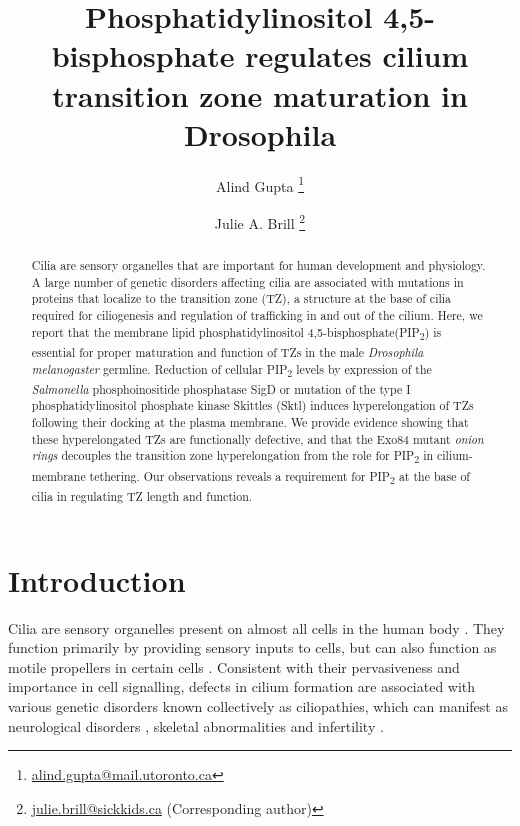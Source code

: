 \documentclass[12pt, twoside, letterpaper]{article}
\title{\bfseries\large Phosphatidylinositol 4,5-bisphosphate regulates cilium transition zone maturation in Drosophila}
\author[1,2]{Alind Gupta \thanks{\url{alind.gupta@mail.utoronto.ca}}}
\author[1,2]{Julie A. Brill \thanks{\url{julie.brill@sickkids.ca} (Corresponding author)}}
\affil[1]{Department of Molecular Genetics, University of Toronto, Toronto, ON M5S 1A8, Canada}
\affil[2]{Program in Cell Biology, Hospital for Sick Children, Toronto, ON M5G 1X8, Canada}
\date{}
\newcommand{\PIP}{PIP\textsubscript{2}}
\begin{document}
\maketitle
\raggedright
\begin{abstract}
  \vspace*{-0.7em}
  Cilia are sensory organelles that are important for human development
  and physiology.
  A large number of genetic disorders affecting cilia are associated with
  mutations in proteins that localize to the transition zone (TZ),
  a structure at the base of cilia required for ciliogenesis and
  regulation of trafficking in and out of the cilium.
  Here, we report that the membrane lipid phosphatidylinositol
  4,5-bisphosphate(\PIP{}) is essential for proper maturation and function
  of TZs in the male \textit{Drosophila melanogaster} germline.
  Reduction of cellular \PIP{} levels by expression of the
  \textit{Salmonella} phosphoinositide phosphatase SigD or mutation of
  the type I phosphatidylinositol phosphate kinase Skittles (Sktl)
  induces hyperelongation of TZs following their docking at the plasma
  membrane.
  We provide evidence showing that these hyperelongated TZs are functionally
  defective, and that the Exo84 mutant \textit{onion rings} decouples the
  transition zone hyperelongation from the role for \PIP{} in cilium-membrane
  tethering.
  Our observations reveals a requirement for \PIP{} at the base of cilia
  in regulating TZ length and function.
\end{abstract}

\section{Introduction}
Cilia are sensory organelles present on almost all cells in the human body
\citep{satir2010primary}.
They function primarily by providing sensory inputs to cells, but can
also function as motile propellers in certain cells
\citep{bloodgood2010sensory}.
Consistent with their pervasiveness and importance in cell signalling,
defects in cilium formation are associated with various genetic disorders
known collectively as ciliopathies, which can manifest as
neurological disorders \citep{valente2014primary},
skeletal abnormalities \citep{hammarsjo2017novel, waters2011ciliopathies}
and infertility \citep{inaba2016sperm}.
\end{document}
